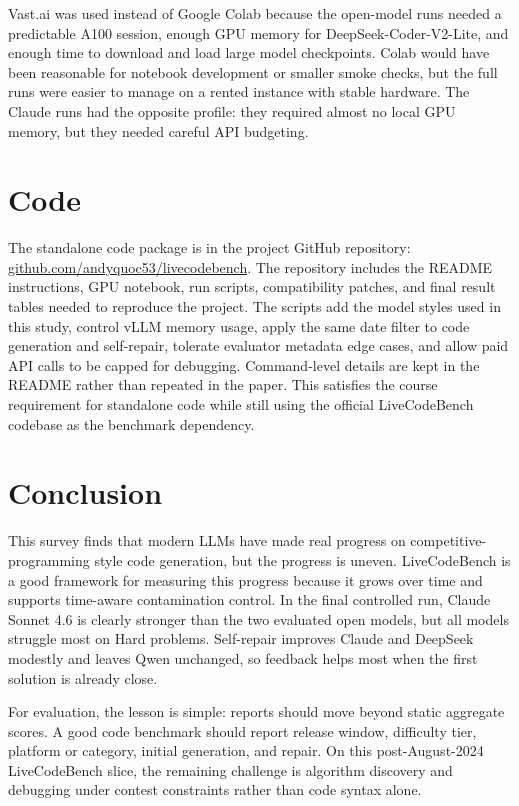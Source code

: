 \documentclass[11pt]{article}
\newcommand{\lcb}{LiveCodeBench}
\begin{document}
Vast.ai was used instead of Google Colab because the open-model runs needed a predictable A100 session, enough GPU memory for DeepSeek-Coder-V2-Lite, and enough time to download and load large model checkpoints. Colab would have been reasonable for notebook development or smaller smoke checks, but the full runs were easier to manage on a rented instance with stable hardware. The Claude runs had the opposite profile: they required almost no local GPU memory, but they needed careful API budgeting.

\section{Code}
The standalone code package is in the project GitHub repository:
\href{https://github.com/andyquoc53/livecodebench}{github.com/andyquoc53/livecodebench}.
The repository includes the README instructions, GPU notebook, run scripts, compatibility patches, and final result tables needed to reproduce the project. The scripts add the model styles used in this study, control vLLM memory usage, apply the same date filter to code generation and self-repair, tolerate evaluator metadata edge cases, and allow paid API calls to be capped for debugging. Command-level details are kept in the README rather than repeated in the paper. This satisfies the course requirement for standalone code while still using the official \lcb{} codebase as the benchmark dependency.

\section{Conclusion}
This survey finds that modern LLMs have made real progress on competitive-programming style code generation, but the progress is uneven. \lcb{} is a good framework for measuring this progress because it grows over time and supports time-aware contamination control. In the final controlled run, Claude Sonnet 4.6 is clearly stronger than the two evaluated open models, but all models struggle most on Hard problems. Self-repair improves Claude and DeepSeek modestly and leaves Qwen unchanged, so feedback helps most when the first solution is already close.

For evaluation, the lesson is simple: reports should move beyond static aggregate scores. A good code benchmark should report release window, difficulty tier, platform or category, initial generation, and repair. On this post-August-2024 \lcb{} slice, the remaining challenge is algorithm discovery and debugging under contest constraints rather than code syntax alone.

\clearpage

\end{document}
